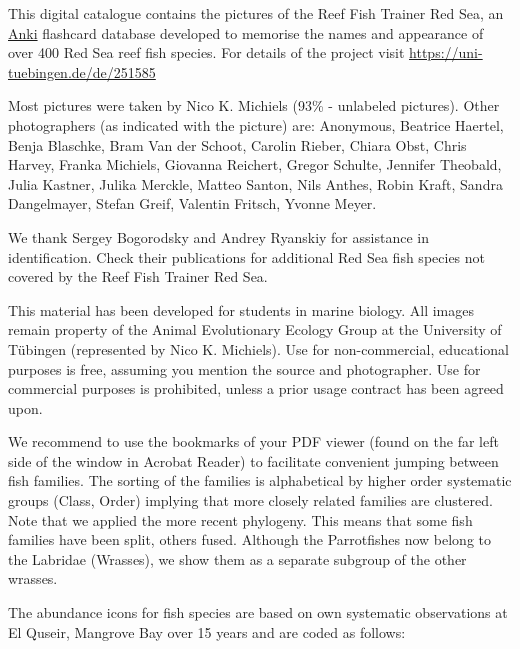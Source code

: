 \documentclass[a4paper]{article}
\begin{document}
\begin{raggedright}

    \bigskip

    This digital catalogue contains the pictures of the Reef Fish Trainer Red Sea, an \href{https://apps.ankiweb.net/}{Anki} flashcard database developed to memorise the names and appearance of over 400 Red Sea reef fish species. For details of the project visit \url{https://uni-tuebingen.de/de/251585}

    \bigskip

    Most pictures were taken by Nico K. Michiels (93\% - unlabeled pictures). Other photographers (as indicated with the picture) are: Anonymous, Beatrice Haertel, Benja Blaschke, Bram Van der Schoot, Carolin Rieber, Chiara Obst, Chris Harvey, Franka Michiels, Giovanna Reichert, Gregor Schulte, Jennifer Theobald, Julia Kastner, Julika Merckle, Matteo Santon, Nils Anthes, Robin Kraft, Sandra Dangelmayer, Stefan Greif, Valentin Fritsch, Yvonne Meyer.

    \bigskip

    We thank Sergey Bogorodsky and Andrey Ryanskiy for assistance in identification. Check their publications for additional Red Sea fish species not covered by the Reef Fish Trainer Red Sea.
    
    \bigskip

    This material has been developed for students in marine biology. All images remain property of the Animal Evolutionary Ecology Group at the University of Tübingen (represented by Nico K. Michiels). Use for non-commercial, educational purposes is free, assuming you mention the source and photographer. Use for commercial purposes is prohibited, unless a prior usage contract has been agreed upon.

    \bigskip

    We recommend to use the bookmarks of your PDF viewer (found on the far left side of the window in Acrobat Reader) to facilitate convenient jumping between fish families. The sorting of the families is alphabetical by higher order systematic groups (Class, Order) implying that more closely related families are clustered. Note that we applied the more recent phylogeny. This means that some fish families have been split, others fused. Although the Parrotfishes now belong to the Labridae (Wrasses), we show them as a separate subgroup of the other wrasses.

    \bigskip

    The abundance icons for fish species are based on own systematic observations at El Quseir, Mangrove Bay over 15 years and are coded as follows:

\end{raggedright}
\end{document}
